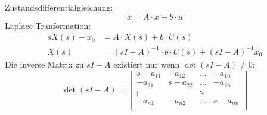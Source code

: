 Zustandsdifferentialgleichung:
\[
	\dot{x} = A \cdot x + b \cdot u
\]
Laplace-Tranformation:
\[\begin{aligned}
	sX(s)-x_0 &= A \cdot X(s) + b \cdot U(s) \\
	X(s) &= (sI-A)^{-1} \cdot b \cdot U(s) + (sI-A)^{-1}x_0
\end{aligned}\]
Die inverse Matrix zu $sI-A$ existiert nur wenn $\det\left(sI-A\right) \neq 0$:
\[
	\det\left(sI-A\right) =\begin{bmatrix}
		s-a_{11} & -a_{12} & \ldots & -a_{1n}\\
		-a_{21}	 & s-a_{22}& \ldots & -a_{2n} \\
		\vdots	 & 		   & \ddots & \\
		-a_{n1}	 & -a_{n2} & \ldots & s-a_{nn}\\
	\end{bmatrix}
\]